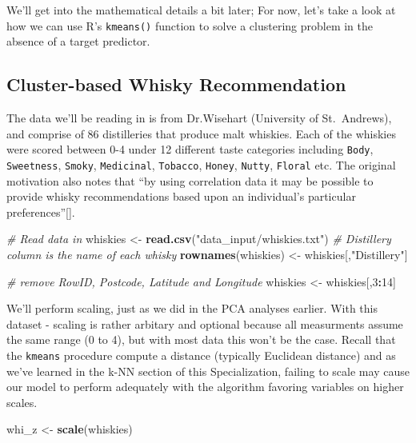 \documentclass[]{article}
\newenvironment{Shaded}{\begin{snugshade}}{\end{snugshade}}
\newcommand{\CommentTok}[1]{\textcolor[rgb]{0.56,0.35,0.01}{\textit{#1}}}
\newcommand{\DecValTok}[1]{\textcolor[rgb]{0.00,0.00,0.81}{#1}}
\newcommand{\KeywordTok}[1]{\textcolor[rgb]{0.13,0.29,0.53}{\textbf{#1}}}
\newcommand{\NormalTok}[1]{#1}
\newcommand{\OperatorTok}[1]{\textcolor[rgb]{0.81,0.36,0.00}{\textbf{#1}}}
\newcommand{\StringTok}[1]{\textcolor[rgb]{0.31,0.60,0.02}{#1}}
\begin{document}
We'll get into the mathematical details a bit later; For now, let's take
a look at how we can use R's \texttt{kmeans()} function to solve a
clustering problem in the absence of a target predictor.

\hypertarget{cluster-based-whisky-recommendation}{%
\subsection{Cluster-based Whisky
Recommendation}\label{cluster-based-whisky-recommendation}}

The data we'll be reading in is from Dr.Wisehart (University of
St.~Andrews), and comprise of 86 distilleries that produce malt
whiskies. Each of the whiskies were scored between 0-4 under 12
different taste categories including \texttt{Body}, \texttt{Sweetness},
\texttt{Smoky}, \texttt{Medicinal}, \texttt{Tobacco}, \texttt{Honey},
\texttt{Nutty}, \texttt{Floral} etc. The original motivation also notes
that ``by using correlation data it may be possible to provide whisky
recommendations based upon an individual's particular
preferences''{[}{]}.

\begin{Shaded}
\begin{Highlighting}[]
\CommentTok{# Read data in}
\NormalTok{whiskies <-}\StringTok{ }\KeywordTok{read.csv}\NormalTok{(}\StringTok{"data_input/whiskies.txt"}\NormalTok{)}
\CommentTok{# Distillery column is the name of each whisky}
\KeywordTok{rownames}\NormalTok{(whiskies) <-}\StringTok{ }\NormalTok{whiskies[,}\StringTok{"Distillery"}\NormalTok{]}

\CommentTok{# remove RowID, Postcode, Latitude and Longitude}
\NormalTok{whiskies <-}\StringTok{ }\NormalTok{whiskies[,}\DecValTok{3}\OperatorTok{:}\DecValTok{14}\NormalTok{]}
\end{Highlighting}
\end{Shaded}

We'll perform scaling, just as we did in the PCA analyses earlier. With
this dataset - scaling is rather arbitary and optional because all
measurments assume the same range (0 to 4), but with most data this
won't be the case. Recall that the \texttt{kmeans} procedure compute a
distance (typically Euclidean distance) and as we've learned in the k-NN
section of this Specialization, failing to scale may cause our model to
perform adequately with the algorithm favoring variables on higher
scales.

\begin{Shaded}
\begin{Highlighting}[]
\NormalTok{whi_z <-}\StringTok{ }\KeywordTok{scale}\NormalTok{(whiskies)}
\end{Highlighting}
\end{Shaded}
\end{document}
